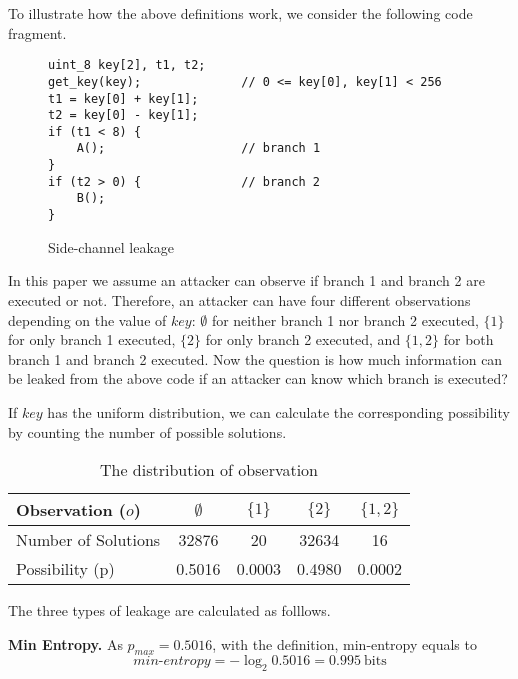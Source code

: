 To illustrate how the above definitions work, we consider the following
code fragment. 

\begin{figure}[h!]
    \centering
\begin{lstlisting}[xleftmargin=.03\textwidth,xrightmargin=.01\textwidth]
uint_8 key[2], t1, t2;
get_key(key);              // 0 <= key[0], key[1] < 256
t1 = key[0] + key[1];
t2 = key[0] - key[1];
if (t1 < 8) {
    A();                   // branch 1
}
if (t2 > 0) {              // branch 2
    B();
}
\end{lstlisting}
\caption{Side-channel leakage}
\label{background::side-channel}
\end{figure}
In this paper we assume an attacker can observe 
if branch 1 and branch 2 are executed or not. Therefore, 
an attacker can have four different observations depending on
the value of $\mathit{key}$:
$\emptyset$ for neither branch 1 nor branch 2 executed,
$\{1\}$ for only branch 1 executed,
$\{2\}$ for only branch 2 executed, and
 $\{1, 2\}$ for both branch 1 and branch 2 executed.
Now the question is how much information can be leaked from the 
above code if an attacker can know which branch is executed?

If $key$ has the uniform distribution, we can calculate the corresponding
possibility by counting the number of possible solutions.
\begin{table}[ht]
    \centering
\caption{The distribution of observation}\label{shtable}
\begin{tabular}{l|cccc}
    \hline
Observation ($o$)  & $\emptyset$ & ${\{1\}}$ & ${\{2\}}$ & ${\{1, 2\}}$ \\ \hline
Number of Solutions &  32876 & 20 & 32634 & 16 \\ \hline
Possibility (p)     & 0.5016 & 0.0003 & 0.4980  & 0.0002   \\
    \hline
\end{tabular}
\end{table}


The three types of leakage are calculated as folllows.

\vspace{3pt}
\textbf{Min Entropy.}
As $p_{\mathit{max}} = 0.5016$, with the definition, min-entropy equals to 
\begin{displaymath}
    \mathit{min\text{-}entropy} = -\log_2{0.5016} = 0.995\ \mathrm{bits}
\end{displaymath}

